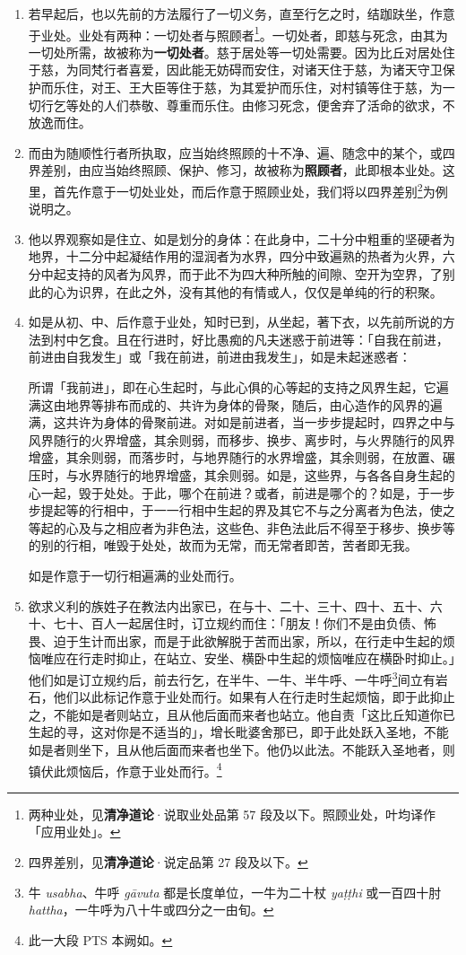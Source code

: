\begin{enumerate}
\item 若早起后，也以先前的方法履行了一切义务，直至行乞之时，结跏趺坐，作意于业处。业处有两种：一切处者与照顾者\footnote{两种业处，见\textbf{清净道论}·说取业处品第 57 段及以下。照顾业处，叶均译作「应用业处」。}。一切处者，即慈与死念，由其为一切处所需，故被称为\textbf{一切处者}。慈于居处等一切处需要。因为比丘对居处住于慈，为同梵行者喜爱，因此能无妨碍而安住，对诸天住于慈，为诸天守卫保护而乐住，对王、王大臣等住于慈，为其爱护而乐住，对村镇等住于慈，为一切行乞等处的人们恭敬、尊重而乐住。由修习死念，便舍弃了活命的欲求，不放逸而住。
\item 而由为随顺性行者所执取，应当始终照顾的十不净、遍、随念中的某个，或四界差别，由应当始终照顾、保护、修习，故被称为\textbf{照顾者}，此即根本业处。这里，首先作意于一切处业处，而后作意于照顾业处，我们将以四界差别\footnote{四界差别，见\textbf{清净道论}·说定品第 27 段及以下。}为例说明之。
\item 他以界观察如是住立、如是划分的身体：在此身中，二十分中粗重的坚硬者为地界，十二分中起凝结作用的湿润者为水界，四分中致遍熟的热者为火界，六分中起支持的风者为风界，而于此不为四大种所触的间隙、空开为空界，了别此的心为识界，在此之外，没有其他的有情或人，仅仅是单纯的行的积聚。
\item 如是从初、中、后作意于业处，知时已到，从坐起，著下衣，以先前所说的方法到村中乞食。且在行进时，好比愚痴的凡夫迷惑于前进等：「自我在前进，前进由自我发生」或「我在前进，前进由我发生」，如是未起迷惑者：\begin{quoting}所谓「我前进」，即在心生起时，与此心俱的心等起的支持之风界生起，它遍满这由地界等排布而成的、共许为身体的骨聚，随后，由心造作的风界的遍满，这共许为身体的骨聚前进。对如是前进者，当一步步提起时，四界之中与风界随行的火界增盛，其余则弱，而移步、换步、离步时，与火界随行的风界增盛，其余则弱，而落步时，与地界随行的水界增盛，其余则弱，在放置、碾压时，与水界随行的地界增盛，其余则弱。如是，这些界，与各各自身生起的心一起，毁于处处。于此，哪个在前进？或者，前进是哪个的？如是，于一步步提起等的行相中，于一一行相中生起的界及其它不与之分离者为色法，使之等起的心及与之相应者为非色法，这些色、非色法此后不得至于移步、换步等的别的行相，唯毁于处处，故而为无常，而无常者即苦，苦者即无我。\end{quoting}如是作意于一切行相遍满的业处而行。
\item 欲求义利的族姓子在教法内出家已，在与十、二十、三十、四十、五十、六十、七十、百人一起居住时，订立规约而住：「朋友！你们不是由负债、怖畏、迫于生计而出家，而是于此欲解脱于苦而出家，所以，在行走中生起的烦恼唯应在行走时抑止，在站立、安坐、横卧中生起的烦恼唯应在横卧时抑止。」他们如是订立规约后，前去行乞，在半牛、一牛、半牛呼、一牛呼\footnote{牛 \textit{usabha}、牛呼 \textit{gāvuta} 都是长度单位，一牛为二十杖 \textit{yaṭṭhi} 或一百四十肘 \textit{hattha}，一牛呼为八十牛或四分之一由旬。}间立有岩石，他们以此标记作意于业处而行。如果有人在行走时生起烦恼，即于此抑止之，不能如是者则站立，且从他后面而来者也站立。他自责「这比丘知道你已生起的寻，这对你是不适当的」，增长毗婆舍那已，即于此处跃入圣地，不能如是者则坐下，且从他后面而来者也坐下。他仍以此法。不能跃入圣地者，则镇伏此烦恼后，作意于业处而行。\footnote{此一大段 PTS 本阙如。}

\end{enumerate}
